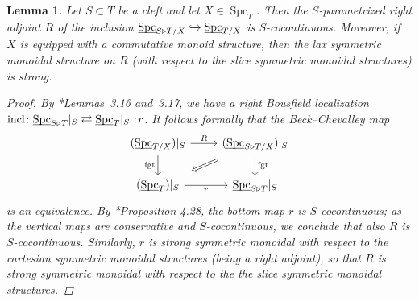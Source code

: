 \documentclass[reqno]{memo-l}
\theoremstyle{mythm}
\newtheorem{lemma}[thm]{Lemma}
\theoremstyle{definition}
\numberwithin{equation}{section}
\DeclareMathOperator{\Spc}{Spc}
\newcommand{\fgt}{\textup{fgt}}
\newcommand{\ulhelper}[2]{\underline{\setbox0=\hbox{$#1#2$}\dp0=0.4pt \box0\relax}}
\newcommand{\ul}[1]{{\mathpalette\ulhelper{#1}}\hbox{\rule[-2pt]{0pt}{0pt}}}
\newcommand{\incl}{{\mathop{\textup{incl}}}}
\newcommand\noloc{%
	\nobreak
	\mspace{6mu plus 1mu}
	{:}
	\nonscript\mkern-\thinmuskip
	\mathpunct{}
	\mspace{2mu}
}
\begin{document}
\begin{lemma}\label{lemma:right-adjoint-right-Bousfield}
    Let $S\subset T$ be a cleft and let $X\in\Spc_T$. Then the $S$-parametrized right adjoint $R$ of the inclusion $\ul\Spc_{S\triangleright T/X}\hookrightarrow\ul\Spc_{T/X}$ is $S$-cocontinuous. Moreover, if $X$ is equipped with a commutative monoid structure, then the lax symmetric monoidal structure on $R$ (with respect to the slice symmetric monoidal structures) is strong.
    \begin{proof}
        By \cite{CLL_Clefts}*{Lemmas~3.16 and~3.17}, we have a right Bousfield localization $\incl\colon\ul\Spc_{S\triangleright T}|_S\rightleftarrows\ul\Spc_T|_S\noloc r$. It follows formally that the Beck--Chevalley map
        \[
            \begin{tikzcd}
                (\ul\Spc_{T/X})|_S\arrow[r,"R"]\arrow[d,"\fgt"'] & (\ul\Spc_{S\triangleright T/X})|_S\arrow[d,"\fgt"]\arrow[dl,Rightarrow,shorten=10pt]\\
                (\ul\Spc_T)|_S\arrow[r,"r"'] & \ul\Spc_{S\triangleright T}|_S
            \end{tikzcd}
        \]
        is an equivalence. By \cite{CLL_Clefts}*{Proposition 4.28}, the bottom map $r$ is $S$-cocontinuous; as the vertical maps are conservative and $S$-cocontinuous, we conclude that also $R$ is $S$-cocontinuous. Similarly, $r$ is strong symmetric monoidal with respect to the cartesian symmetric monoidal structures (being a right adjoint), so that $R$ is strong symmetric monoidal with respect to the the slice symmetric monoidal structures. 
    \end{proof}
\end{lemma}
\end{document}
